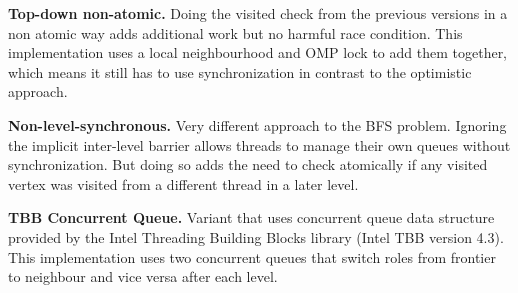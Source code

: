 \documentclass[letterpaper]{article}
\newcommand{\mypar}[1]{{\bf #1.}} %
\begin{document}
		\mypar{Top-down non-atomic}
		Doing the visited check from the previous versions in a non atomic way adds additional work but no harmful race condition.
		This implementation uses a local neighbourhood and OMP lock to add them together, which means it still has to use synchronization in contrast to the optimistic approach.

		\mypar{Non-level-synchronous}
		Very different approach to the BFS problem. 
		Ignoring the implicit inter-level barrier allows threads to manage their own queues without synchronization. 
		But doing so adds the need to check atomically if any visited vertex was visited from a different thread in a later level.


		\mypar{TBB Concurrent Queue}
		Variant that uses concurrent queue data structure provided by the Intel Threading Building Blocks library (Intel TBB version 4.3). 
		This implementation uses two concurrent queues that switch roles from frontier to neighbour and vice versa after each level.
\end{document}
